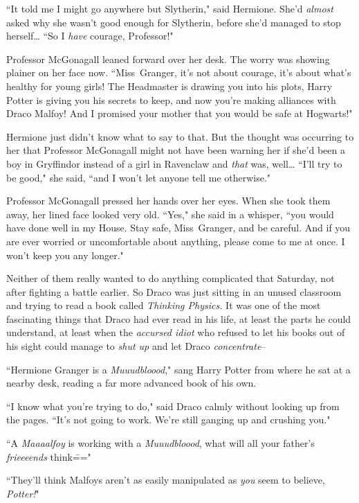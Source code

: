 ``It told me I might go anywhere but Slytherin," said Hermione. She'd \emph{almost} asked why she wasn't good enough for Slytherin, before she'd managed to stop herself{\ldots} ``So I \emph{have} courage, Professor!"

Professor McGonagall leaned forward over her desk. The worry was showing plainer on her face now. ``Miss~Granger, it's not about courage, it's about what's healthy for young girls! The Headmaster is drawing you into his plots, Harry Potter is giving you his secrets to keep, and now you're making alliances with Draco Malfoy! And I promised your mother that you would be safe at Hogwarts!"

Hermione just didn't know what to say to that. But the thought was occurring to her that Professor McGonagall might not have been warning her if she'd been a boy in Gryffindor instead of a girl in Ravenclaw and \emph{that} was, well{\ldots} ``I'll try to be good," she said, ``and I won't let anyone tell me otherwise."

Professor McGonagall pressed her hands over her eyes. When she took them away, her lined face looked very old. ``Yes," she said in a whisper, ``you would have done well in my House. Stay safe, Miss~Granger, and be careful. And if you are ever worried or uncomfortable about anything, please come to me at once. I won't keep you any longer."


Neither of them really wanted to do anything complicated that Saturday, not after fighting a battle earlier. So Draco was just sitting in an unused classroom and trying to read a book called \emph{Thinking Physics.} It was one of the most fascinating things that Draco had ever read in his life, at least the parts he could understand, at least when the \emph{accursed idiot} who refused to let his books out of his sight could manage to \emph{shut up} and let Draco \emph{concentrate}\---

``Hermione Granger is a \emph{Muuudbloood}," sang Harry Potter from where he sat at a nearby desk, reading a far more advanced book of his own.

``I know what you're trying to do," said Draco calmly without looking up from the pages. ``It's not going to work. We're still ganging up and crushing you."

``A \emph{Maaaalfoy} is working with a \emph{Muuudbloood}, what will all your father's \emph{frieeeends} think\==="

``They'll think Malfoys aren't as easily manipulated as \emph{you} seem to believe, \emph{Potter!}"

